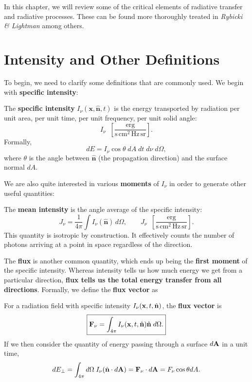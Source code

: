 In this chapter, we will review some of the critical elements of radiative transfer and radiative processes. These can be found more thoroughly treated in \textit{Rybicki \& Lightman} among others.

\section{Intensity and Other Definitions}

To begin, we need to clarify some definitions that are commonly used. We begin with \textbf{specific intensity}:
\vspace{0.5cm}
\begin{definition}
The \textbf{specific intensity} $I_\nu(\mathbf{x}, \hat{\mathbf{n}}, t)$
is the energy transported by radiation per unit area, per unit time, per
unit frequency, per unit solid angle:
\[
    I_\nu \;\; \left[ \frac{\mathrm{erg}}
                          {\mathrm{s}\,\mathrm{cm}^2\,
                           \mathrm{Hz}\,\mathrm{sr}} \right].
\]
Formally,
\[
    dE = I_\nu \cos\theta \; dA \; dt \; d\nu \; d\Omega,
\]
where $\theta$ is the angle between $\hat{\mathbf{n}}$ (the propagation
direction) and the surface normal $dA$. 
\end{definition}
\vspace{0.5cm}
We are also quite interested in various \textbf{moments} of $I_\nu$ in order to generate other useful quantities:
\vspace{0.25cm}
\begin{definition}
The \textbf{mean intensity} is the angle average of the specific
intensity:
\[
    J_\nu = \frac{1}{4\pi}\int I_\nu(\hat{\mathbf{n}})\, d\Omega,
    \qquad
    J_\nu \;\; \left[ \frac{\mathrm{erg}}
                          {\mathrm{s}\,\mathrm{cm}^2\,
                           \mathrm{Hz}\,\mathrm{sr}} \right].
\]
This quantity is isotropic by construction. It effectively counts the number of photons arriving at a point in space regardless of the direction.
\end{definition}
\vspace{0.25cm}
The \textbf{flux} is another common quantity, which ends up being the \textbf{first moment} of the specific intensity. Whereas intensity tells us how much energy we get from a particular direction, \textbf{flux tells us the total energy transfer from all directions}. Formally, we define the \textbf{flux vector} as
\vspace{0.25cm}
\begin{definition}[Flux]
    For a radiation field with specific intensity $I_\nu({\bf x},t, \hat{\bf n})$, the \textbf{flux vector} is 
\begin{equation}
        \boxed{
    {\bf F}_\nu = \int_{4\pi} I_\nu({\bf x},t,\hat{\bf n}) \hat{\bf n} \; d\Omega.
    }
\end{equation}
    If we then consider the quantity of energy passing through a surface $d{\bf A}$ in a unit time,
    \[
    dE_{\perp} = \int_{4\pi} d\Omega \; I_\nu (\hat{\bf n} \cdot d{\bf A}) = {\bf F}_\nu \cdot d{\bf A} = F_\nu \cos\theta dA.
    \]
\end{definition}

